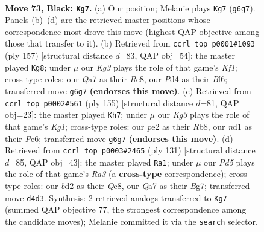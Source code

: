 \documentclass[11pt]{article}
\begin{document}
\clearpage

\begin{figure}[p]\centering
\begin{subfigure}{0.46\textwidth}\centering
\resizebox{\linewidth}{!}{%
\newchessgame
\chessboard[
  setfen={r7/q3b3/5nk1/P1p2p2/3p1Pp1/8/QR1BP3/3NK3 b - - 7 73},
  showmover=false,
  pgfstyle=straightmove, color=movearrow, markmove={g6-g7}
]}
\caption{}
\end{subfigure}\hfill
\begin{subfigure}{0.46\textwidth}\centering
\resizebox{\linewidth}{!}{%
\newchessgame
\chessboard[
  setfen={2r2k2/3q1pp1/5b1p/1p3P1P/1P6/P3R1PK/2B3Q1/8 b - - 52 79},
  showmover=false,
  pgfstyle=straightmove, color=movearrow, markmove={f8-g8}
]}
\caption{}
\end{subfigure}
\\[4pt]
\begin{subfigure}{0.46\textwidth}\centering
\resizebox{\linewidth}{!}{%
\newchessgame
\chessboard[
  setfen={1r4k1/2q3p1/4pb2/2p1n3/2N1P2p/7P/Q5PB/R6K b - - 12 78},
  showmover=false,
  pgfstyle=straightmove, color=movearrow, markmove={g8-h7}
]}
\caption{}
\end{subfigure}\hfill
\begin{subfigure}{0.46\textwidth}\centering
\resizebox{\linewidth}{!}{%
\newchessgame
\chessboard[
  setfen={4q1k1/6bp/r3p1p1/1pBpP3/1P5P/2P3P1/4QRK1/8 b - - 46 66},
  showmover=false,
  pgfstyle=straightmove, color=movearrow, markmove={a6-a1}
]}
\caption{}
\end{subfigure}
\caption{\textbf{Move 73, Black: \texttt{Kg7}.} (a) Our position; Melanie plays \texttt{Kg7} (\texttt{g6g7}). Panels (b)--(d) are the retrieved master positions whose correspondence most drove this move (highest QAP objective among those that transfer to it). (b) Retrieved from \texttt{ccrl\_top\_p0001\#1093} (ply 157) [structural distance $d$=83, QAP obj=54]: the master played \texttt{Kg8}; under $\mu$ our \emph{Kg3} plays the role of that game's \emph{Kf1}; cross-type roles: our \emph{Q}a7 as their \emph{R}c8, our \emph{P}d4 as their \emph{B}f6; transferred move \texttt{g6g7} \textbf{(endorses this move)}. (c) Retrieved from \texttt{ccrl\_top\_p0002\#561} (ply 155) [structural distance $d$=81, QAP obj=23]: the master played \texttt{Kh7}; under $\mu$ our \emph{Kg3} plays the role of that game's \emph{Kg1}; cross-type roles: our \emph{p}e2 as their \emph{R}b8, our \emph{n}d1 as their \emph{P}e6; transferred move \texttt{g6g7} \textbf{(endorses this move)}. (d) Retrieved from \texttt{ccrl\_top\_p0003\#2465} (ply 131) [structural distance $d$=85, QAP obj=43]: the master played \texttt{Ra1}; under $\mu$ our \emph{Pd5} plays the role of that game's \emph{Ra3} (a \textbf{cross-type} correspondence); cross-type roles: our \emph{b}d2 as their \emph{Q}e8, our \emph{Q}a7 as their \emph{B}g7; transferred move \texttt{d4d3}. Synthesis: 2 retrieved analogs transferred to \texttt{Kg7} (summed QAP objective 77, the strongest correspondence among the candidate moves); Melanie committed it via the \texttt{search} selector.}
\label{fig:thought-m145}
\end{figure}
\end{document}

